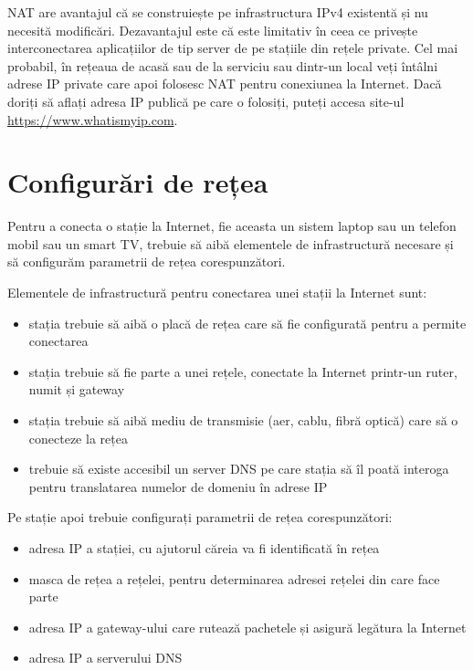 NAT are avantajul că se construiește pe infrastructura IPv4 existentă și nu necesită modificări.
Dezavantajul este că este limitativ în ceea ce privește interconectarea aplicațiilor de tip server de pe stațiile din rețele private.
Cel mai probabil, în rețeaua de acasă sau de la serviciu sau dintr-un local veți întâlni adrese IP private care apoi folosesc NAT pentru conexiunea la Internet.
Dacă doriți să aflați adresa IP publică pe care o folosiți, puteți accesa site-ul \url{https://www.whatismyip.com}.

\section{Configurări de rețea}
\label{sec:net:config}

Pentru a conecta o stație la Internet, fie aceasta un sistem laptop sau un telefon mobil sau un smart TV, trebuie să aibă elementele de infrastructură necesare și să configurăm parametrii de rețea corespunzători.

Elementele de infrastructură pentru conectarea unei stații la Internet sunt:

\begin{itemize}
  \item stația trebuie să aibă o placă de rețea care să fie configurată pentru a permite conectarea
  \item stația trebuie să fie parte a unei rețele, conectate la Internet printr-un ruter, numit și gateway
  \item stația trebuie să aibă mediu de transmisie (aer, cablu, fibră optică) care să o conecteze la rețea
  \item trebuie să existe accesibil un server DNS pe care stația să îl poată interoga pentru translatarea numelor de domeniu în adrese IP
\end{itemize}

Pe stație apoi trebuie configurați parametrii de rețea corespunzători:

\begin{itemize}
  \item adresa IP a stației, cu ajutorul căreia va fi identificată în rețea
  \item masca de rețea a rețelei, pentru determinarea adresei rețelei din care face parte
  \item adresa IP a gateway-ului care rutează pachetele și asigură legătura la Internet
  \item adresa IP a serverului DNS
\end{itemize}

